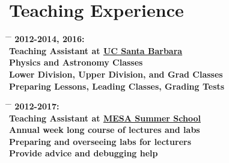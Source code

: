 \documentclass[10pt]{article} %
\begin{document}
\section{Teaching Experience}
\parbox{0.5\textwidth}{ %
\begin{tabbing}
\hspace{3cm} \= \hspace{4cm} \= \kill
\bf{2012-2014, 2016:} \\
Teaching Assistant at \href{http://www.ucsb.edu}{UC Santa Barbara}\\[5pt]
\sqbullet\hspace{3mm}Physics and Astronomy Classes \\
\sqbullet\hspace{3mm}Lower Division, Upper Division, and Grad Classes \\
\sqbullet\hspace{3mm}Preparing Lessons, Leading Classes, Grading Tests
\end{tabbing}}
\hfill %
\parbox{0.5\textwidth}{ %
\begin{tabbing}
\hspace{3cm} \= \hspace{4cm} \= \kill
\bf{2012-2017:} \\
Teaching Assistant at \href{http://cococubed.asu.edu/mesa_summer_school_2017/}{MESA Summer School} \\[5pt]
\sqbullet\hspace{3mm}Annual week long course of lectures and labs\\
\sqbullet\hspace{3mm}Preparing and overseeing labs for lecturers\\
\sqbullet\hspace{3mm}Provide advice and debugging help
\end{tabbing}}

\end{document}
